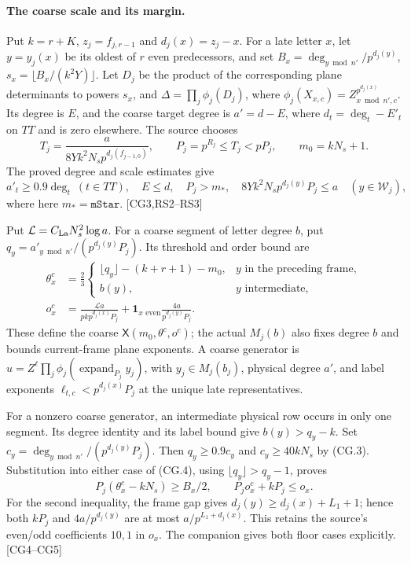 \paragraph{The coarse scale and its margin.}
Put $k=r+K$, $z_j=f_{j,r-1}$ and $d_j(x)=z_j-x$. For a late letter $x$,
let $y=y_j(x)$ be its oldest of $r$ even predecessors, and set
$B_x=\deg_{y\bmod n'}/p^{d_j(y)}$, $s_x=\lfloor B_x/(k^2Y)\rfloor$.
Let $D_j$ be the product of the corresponding plane determinants to
powers $s_x$, and $\Delta=\prod_j\phi_j(D_j)$, where
$\phi_j(X_{x,c})=Z_{x\bmod n',c}^{p^{d_j(x)}}$.
Its degree is $E$, and the coarse target degree is $a'=d-E$, where
$d_t=\deg_t-E'_t$ on $TT$ and is zero elsewhere.
The source chooses
\[
 T_j=\frac{a}{8Yk^2N_s p^{d_j(f_{j-1,0})}},\qquad
 P_j=p^{R_j}\le T_j<pP_j,\qquad m_0=kN_s+1.           \tag{CG.2}
\]
The proved degree and scale estimates give
\[
 a'_t\ge0.9\deg_t\ (t\in TT),\quad E\le d,\quad P_j>m_*,\quad
 8Yk^2N_s p^{d_j(y)}P_j\le a\quad(y\in\mathcal W_j),  \tag{CG.3}
\]
where here $m_*=\texttt{mStar}$. \textsf{[CG3,RS2--RS3]}

Put $\mathcal L=C_{\rm La}N_s^2\log a$. For a coarse segment of letter degree $b$, put
$q_y=a'_{y\bmod n'}/(p^{d_j(y)}P_j)$. Its threshold and order bound are
\[
\begin{aligned}
 \theta^c_x&=\frac23
 \begin{cases}
  \lfloor q_y\rfloor-(k+r+1)-m_0,&y\text{ in the preceding frame},\\
  b(y),&y\text{ intermediate},
 \end{cases}\\
 o^c_x&=\frac{\mathcal L a}{pkp^{d_j(x)}P_j}
       +\mathbf1_{x\text{ even}}\frac{4a}{p^{d_j(y)}P_j}.
\end{aligned}                                                    \tag{CG.4}
\]
These define the coarse $\mathsf X(m_0,\theta^c,o^c)$; the actual
$M_j(b)$ also fixes degree $b$ and bounds current-frame plane exponents.
A coarse generator is
$u=Z^\ell\prod_j\phi_j(\operatorname{expand}_{P_j}y_j)$, with
$y_j\in M_j(b_j)$, physical degree $a'$, and label exponents
$\ell_{t,c}<p^{d_j(x)}P_j$ at the unique late representatives.

For a nonzero coarse generator, an intermediate physical row occurs
in only one segment. Its degree identity and its label bound give
$b(y)>q_y-k$. Set $c_y=\deg_{y\bmod n'}/(p^{d_j(y)}P_j)$.
Then $q_y\ge0.9c_y$ and $c_y\ge40kN_s$ by (CG.3).
Substitution into either case of (CG.4), using
$\lfloor q_y\rfloor>q_y-1$, proves
\[
 P_j(\theta^c_x-kN_s)\ge B_x/2,
 \qquad P_j o^c_x+kP_j\le o_x.                       \tag{CG.5}
\]
For the second inequality, the frame gap gives
$d_j(y)\ge d_j(x)+L_1+1$; hence both $kP_j$ and
$4a/p^{d_j(y)}$ are at most $a/p^{L_1+d_j(x)}$.
This retains the source's even/odd coefficients $10,1$ in $o_x$.
The companion gives both floor cases explicitly. \textsf{[CG4--CG5]}

